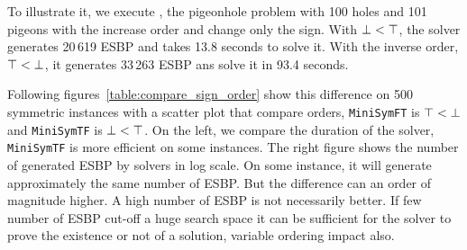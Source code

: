 To illustrate it, we execute , the pigeonhole problem with 100 holes and 101 pigeons with 
the increase order and change only the sign.
With  $\bot < \top$, the solver generates 20\,619 ESBP and takes 13.8 seconds to solve it.
With the inverse order, $\top < \bot$, it generates 33\,263 ESBP ans solve it in 93.4 seconds.

Following figures~\ref{table:compare_sign_order} show this difference on 500 symmetric instances with
a scatter plot that compare orders, \texttt{MiniSymFT} is $\top < \bot$ and  \texttt{MiniSymTF} is $\bot < \top$.
On the left, we compare the duration of the solver, \texttt{MiniSymTF} is more efficient on some \unsat instances.
The right figure shows the number of generated ESBP by solvers in log scale. On some instance, it will generate 
approximately the same number of ESBP. But the difference can an order of magnitude higher. A high number of ESBP is not necessarily
better. If few number of ESBP cut-off a huge search space it can be sufficient for the solver to prove the existence or not 
of a solution, variable ordering impact also.


